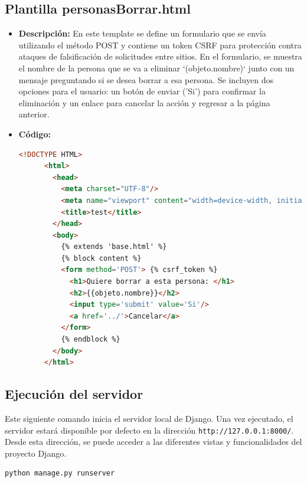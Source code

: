 \documentclass{article}
\begin{document}
  \subsection{Plantilla personasBorrar.html}
  \begin{itemize}
    \item \textbf{Descripción: }En este template se define un formulario que se envía utilizando el método POST y contiene un token CSRF para protección contra ataques 
    de falsificación de solicitudes entre sitios. En el formulario, se muestra el nombre de la persona que se va a eliminar `({{objeto.nombre}})`
    junto con un mensaje preguntando si se desea borrar a esa persona. Se incluyen dos opciones para el usuario: un botón de enviar ('Si') 
    para confirmar la eliminación y un enlace para cancelar la acción y regresar a la página anterior.
    \item \textbf{Código: }
    \begin{lstlisting}[language=html]
      <!DOCTYPE HTML>
      <html>
        <head>
          <meta charset="UTF-8"/>
          <meta name="viewport" content="width=device-width, initial-scale=1.0"/>
          <title>test</title>
        </head>
        <body>
          {% extends 'base.html' %}
          {% block content %}
          <form method='POST'> {% csrf_token %}
            <h1>Quiere borrar a esta persona: </h1>
            <h2>{{objeto.nombre}}</h2>
            <input type='submit' value='Si'/>
            <a href='../'>Cancelar</a>
          </form>
          {% endblock %}
        </body>
      </html>
    \end{lstlisting}
  \end{itemize}
  

  \subsection{Ejecución del servidor}
  Este siguiente comando inicia el servidor local de Django. Una vez ejecutado, el servidor estará disponible por defecto en la dirección 
  \texttt{http://127.0.0.1:8000/}. Desde esta dirección, se puede acceder a las diferentes vistas y funcionalidades del 
  proyecto Django.
  \begin{lstlisting}[language=bash]
    python manage.py runserver
  \end{lstlisting}

\end{document}
